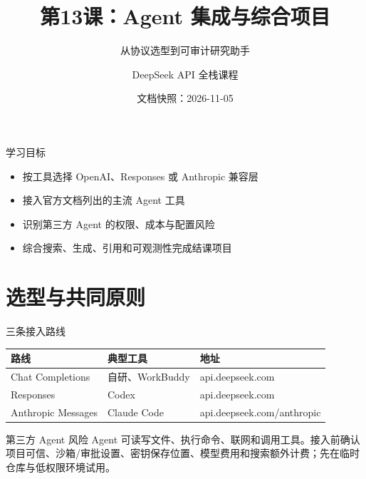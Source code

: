 \documentclass[aspectratio=169,UTF8]{ctexbeamer}
\title{第13课：Agent 集成与综合项目}
\subtitle{从协议选型到可审计研究助手}
\author{DeepSeek API 全栈课程}
\date{文档快照：2026-11-05}
\begin{document}
\frame{\titlepage}
\begin{frame}{学习目标}
\begin{itemize}
  \item 按工具选择 OpenAI、Responses 或 Anthropic 兼容层
  \item 接入官方文档列出的主流 Agent 工具
  \item 识别第三方 Agent 的权限、成本与配置风险
  \item 综合搜索、生成、引用和可观测性完成结课项目
\end{itemize}
\end{frame}
\section{选型与共同原则}
\begin{frame}{三条接入路线}
\begin{tabular}{lll}
\toprule
路线 & 典型工具 & 地址\\
\midrule
Chat Completions & 自研、WorkBuddy & api.deepseek.com\\
Responses & Codex & api.deepseek.com\\
Anthropic Messages & Claude Code & api.deepseek.com/anthropic\\
\bottomrule
\end{tabular}
\end{frame}
\begin{frame}{第三方 Agent 风险}
Agent 可读写文件、执行命令、联网和调用工具。接入前确认项目可信、沙箱/审批设置、密钥保存位置、模型费用和搜索额外计费；先在临时仓库与低权限环境试用。
\end{frame}
\end{document}
